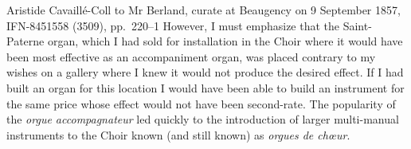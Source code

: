   {Aristide Cavaillé-Coll to Mr Berland, curate at Beaugency on 9 September 1857, \bnf{} IFN-8451558 (3509), pp.~220--1}
{However, I must emphasize that the Saint-Paterne organ, which I had sold for installation in the Choir where it would have been most effective as an accompaniment organ, was placed contrary to my wishes on a gallery where I knew it would not produce the desired effect. If I had built an organ for this location I would have been able to build an instrument for the same price whose effect would not have been second-rate.}
  {\cite[Adapted from a partial translation in][145]{DouglassCavailleCollmusiciansdocumented1980}}
\noindent
The popularity of the \emph{orgue accompagnateur} led quickly to the introduction of larger multi-manual instruments to the Choir known (and still known) as \textit{orgues de chœur}.

